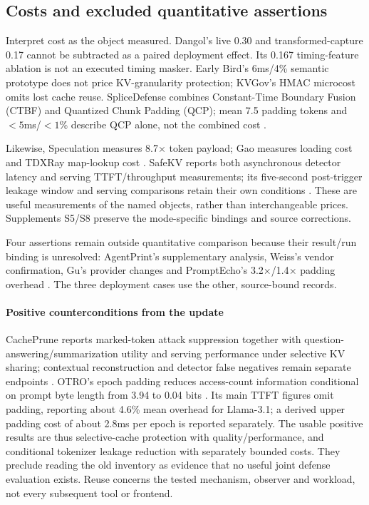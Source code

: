 \subsection{Costs and excluded quantitative assertions}
Interpret cost as the object measured. Dangol's live 0.30 and transformed-capture 0.17 cannot be subtracted as a paired deployment effect. Its 0.167 timing-feature ablation is not an executed timing masker. Early Bird's 6ms/4\% semantic prototype does not price KV-granularity protection; KVGov's HMAC microcost omits lost cache reuse. SpliceDefense combines Constant-Time Boundary Fusion (CTBF) and Quantized Chunk Padding (QCP); mean 7.5 padding tokens and $<5$ms/$<1$\% describe QCP alone, not the combined cost \cite{dangol2026workflow,earlybird2025,addagada2026kvgov,spliceleak2026}.

Likewise, Speculation measures 8.7$\times$ token payload; Gao measures loading cost and TDXRay map-lookup cost \cite{wei2024speculation,gao2025iknow,hornetz2026tdxray}. SafeKV reports both asynchronous detector latency and serving TTFT/throughput measurements; its five-second post-trigger leakage window and serving comparisons retain their own conditions \cite{chu2025safekv}. These are useful measurements of the named objects, rather than interchangeable prices. Supplements S5/S8 preserve the mode-specific bindings and source corrections.

Four assertions remain outside quantitative comparison because their result/run binding is unresolved: AgentPrint's supplementary analysis, Weiss's vendor confirmation, Gu's provider changes and PromptEcho's 3.2$\times$/1.4$\times$ padding overhead \cite{agentprint2025,weiss2024prompt,gu2025promptcaching,prompt_echo2026}. The three deployment cases use the other, source-bound records.

\paragraph{Positive counterconditions from the update}
CachePrune reports marked-token attack suppression together with question-answering/summarization utility and serving performance under selective KV sharing; contextual reconstruction and detector false negatives remain separate endpoints \cite[Section 5]{wu2026cacheprune}. OTRO's epoch padding reduces access-count information conditional on prompt byte length from 3.94 to 0.04 bits \cite[Section VII]{lee2026otro}. Its main TTFT figures omit padding, reporting about 4.6\% mean overhead for Llama-3.1; a derived upper padding cost of about 2.8ms per epoch is reported separately. The usable positive results are thus selective-cache protection with quality/performance, and conditional tokenizer leakage reduction with separately bounded costs. They preclude reading the old inventory as evidence that no useful joint defense evaluation exists. Reuse concerns the tested mechanism, observer and workload, not every subsequent tool or frontend.
